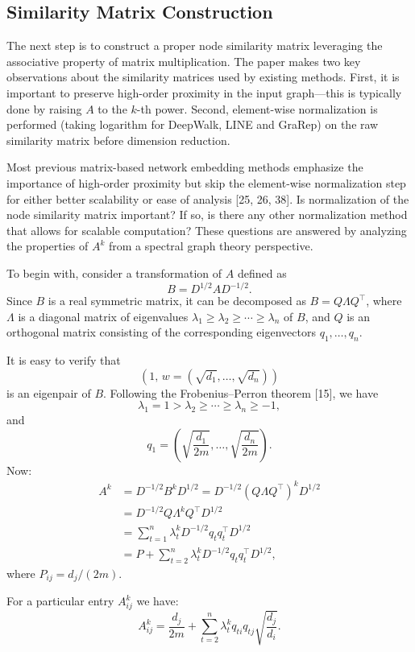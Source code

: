 \documentclass[11pt]{article}
\begin{document}
\subsection{Similarity Matrix Construction}

The next step is to construct a proper node similarity matrix leveraging the associative property of matrix multiplication. The paper makes two key observations about the similarity matrices used by existing methods. First, it is important to preserve high-order proximity in the input graph---this is typically done by raising $A$ to the $k$-th power. Second, element-wise normalization is performed (taking logarithm for DeepWalk, LINE and GraRep) on the raw similarity matrix before dimension reduction.

Most previous matrix-based network embedding methods emphasize the importance of high-order proximity but skip the element-wise normalization step for either better scalability or ease of analysis [25, 26, 38]. Is normalization of the node similarity matrix important? If so, is there any other normalization method that allows for scalable computation? These questions are answered by analyzing the properties of $A^k$ from a spectral graph theory perspective.

To begin with, consider a transformation of $A$ defined as
\[
B = D^{1/2} A D^{-1/2}.
\]
Since $B$ is a real symmetric matrix, it can be decomposed as $B=Q\Lambda Q^\top$, where $\Lambda$ is a diagonal matrix of eigenvalues $\lambda_1 \ge \lambda_2 \ge \cdots \ge \lambda_n$ of $B$, and $Q$ is an orthogonal matrix consisting of the corresponding eigenvectors $q_1,\ldots,q_n$.

It is easy to verify that
\[
\left(1,\, w = (\sqrt{d_1},\ldots,\sqrt{d_n})\right)
\]
is an eigenpair of $B$. Following the Frobenius--Perron theorem [15], we have
\[
\lambda_1 = 1 > \lambda_2 \ge \cdots \ge \lambda_n \ge -1,
\]
and
\[
q_1 = \left(\sqrt{\frac{d_1}{2m}},\ldots,\sqrt{\frac{d_n}{2m}}\right).
\]
Now:
\begin{align}
A^k &= D^{-1/2} B^k D^{1/2} = D^{-1/2}(Q\Lambda Q^\top)^k D^{1/2} \\
&= D^{-1/2} Q\Lambda^k Q^\top D^{1/2} \\
&= \sum_{t=1}^{n} \lambda_t^k D^{-1/2} q_t q_t^\top D^{1/2} \\
&= P + \sum_{t=2}^{n} \lambda_t^k D^{-1/2} q_t q_t^\top D^{1/2},
\end{align}
where $P_{ij} = d_j/(2m)$.

For a particular entry $A^k_{ij}$ we have:
\begin{equation}
A^k_{ij} = \frac{d_j}{2m} + \sum_{t=2}^{n} \lambda_t^k q_{ti} q_{tj} \sqrt{\frac{d_j}{d_i}}.
\end{equation}
\end{document}
